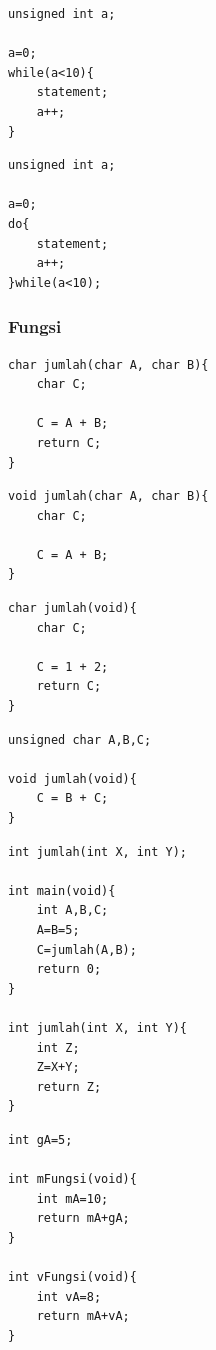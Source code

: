 \documentclass[12pt,]{article}
\begin{document}
	\begin{verbatim}
unsigned int a;
	
a=0;
while(a<10){
	statement;
	a++;
}
	\end{verbatim}
	
	\begin{verbatim}
unsigned int a;

a=0;
do{
	statement;
	a++;
}while(a<10);
	\end{verbatim}
	
	\subsubsection{Fungsi}
	\begin{verbatim}
char jumlah(char A, char B){
	char C;

	C = A + B;
	return C;
}
	\end{verbatim}

	\begin{verbatim}
void jumlah(char A, char B){
	char C;
	
	C = A + B;
}
	\end{verbatim}
	
	\begin{verbatim}
char jumlah(void){
	char C;
	
	C = 1 + 2;
	return C;
}
	\end{verbatim}
	
	\begin{verbatim}
unsigned char A,B,C;

void jumlah(void){
	C = B + C;
}
	\end{verbatim}
	
	\begin{verbatim}
int jumlah(int X, int Y);

int main(void){
	int A,B,C;
	A=B=5;
	C=jumlah(A,B);
	return 0;
}

int jumlah(int X, int Y){
	int Z;
	Z=X+Y;
	return Z;
}
	\end{verbatim}

	\begin{verbatim}
int gA=5;

int mFungsi(void){
	int mA=10;
	return mA+gA;
}

int vFungsi(void){
	int vA=8;
	return mA+vA;
}
	\end{verbatim}
	
\end{document}
